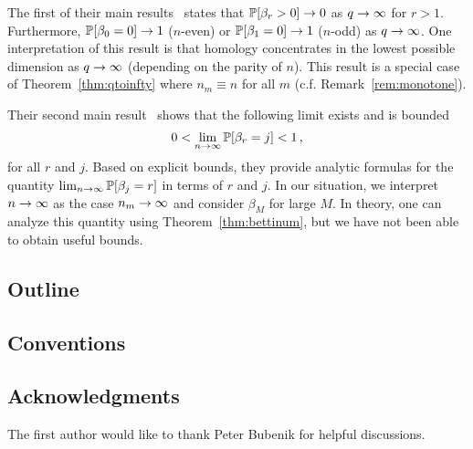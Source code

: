 The first of their main results~\cite[Thm 2.1]{ginzburg2017random} states that
$\mathbb{P}[\beta_r > 0] \rightarrow 0$ as $q \rightarrow \infty$ for $r>1$. Furthermore, $\mathbb{P}[\beta_0
= 0] \rightarrow 1$ ($n$-even) or $\mathbb{P}[\beta_1 = 0] \rightarrow 1$ ($n$-odd) as $q \rightarrow \infty$.
One interpretation of this result is that homology concentrates in the
lowest possible dimension as $q \rightarrow \infty$ (depending on the parity of $n$).
This result is a special case of Theorem~\ref{thm:qtoinfty} where $n_m \equiv
n$ for all $m$ (c.f.  Remark~\ref{rem:monotone}).

Their second main result~\cite[Thm 2.2]{ginzburg2017random} shows that 
the following limit exists and is bounded
\[
  0 < \lim_{n \rightarrow \infty} \mathbb{P}[\beta_r = j] < 1 \, ,
\]
for all $r$ and $j$. Based on explicit bounds, they provide analytic
formulas for the quantity $\lim_{n\rightarrow \infty}\mathbb{P}[\beta_j=r]$ in terms
of $r$ and $j$. In our situation, we interpret $n \rightarrow \infty$ as the case
$n_m \rightarrow \infty$ and consider $\beta_M$ for large $M$. In theory,
one can analyze this quantity using Theorem~\ref{thm:bettinum},
but we have not been able to obtain useful bounds.

\subsection*{Outline}

\subsection*{Conventions}

\subsection*{Acknowledgments} The first author would like to thank
Peter Bubenik for helpful discussions.
